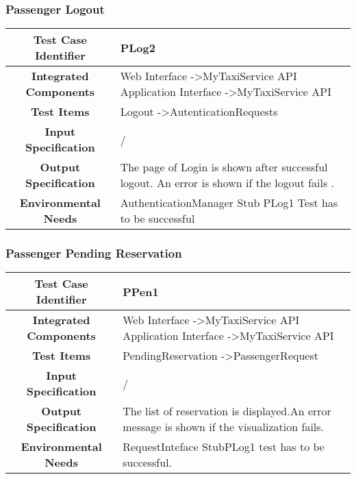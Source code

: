 \documentclass[11pt, a4paper,titlepage]{article}
\begin{document}
	\subsubsection{Passenger Logout}
	\begin{tabularx}{\textwidth}{| c|X|}
		\hline \textbf{Test Case Identifier} & PLog2 \\
		\hline \textbf{Integrated Components} & Web Interface -\textgreater MyTaxiService API \newline 
		Application Interface -\textgreater MyTaxiService API \\
		\hline \textbf{Test Items} & Logout -\textgreater AutenticationRequests \\
		\hline \textbf{Input Specification} & / \\
		\hline \textbf{Output Specification} & 
		The page of Login is shown after successful logout.\newline
		An error is shown if the logout fails .\\
		\hline \textbf{Environmental Needs} & AuthenticationManager Stub \newline	PLog1 Test has to be successful \\
		\hline
	\end{tabularx}
	\newline
	\newline
	\subsubsection{Passenger Pending Reservation }
	\begin{tabularx}{\textwidth}{| c|X|}
		\hline \textbf{Test Case Identifier} & PPen1 \\
		\hline \textbf{Integrated Components} & Web Interface -\textgreater MyTaxiService API \newline 
		Application Interface -\textgreater MyTaxiService API \\ 
		\hline \textbf{Test Items} & PendingReservation -\textgreater PassengerRequest \\
		\hline \textbf{Input Specification} & / \\
		\hline \textbf{Output Specification} & The list of reservation is displayed.\newline An error message is shown if the visualization fails. \\
		\hline \textbf{Environmental Needs} & RequestInteface Stub\newline PLog1 test has to be successful. \\
		\hline
	\end{tabularx}
	\newline
	\newline
\end{document}
